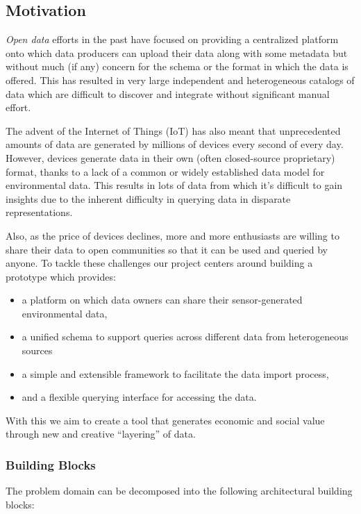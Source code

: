 \subsection{Motivation}\label{motivation}

\emph{Open data} efforts in the past have focused on providing a
centralized platform onto which data producers can upload their data
along with some metadata but without much (if any) concern for the
schema or the format in which the data is offered. This has resulted in
very large independent and heterogeneous catalogs of data which are
difficult to discover and integrate without significant manual effort.

The advent of the Internet of Things (IoT) has also meant that
unprecedented amounts of data are generated by millions of devices every
second of every day. However, devices generate data in their own (often
closed-source proprietary) format, thanks to a lack of a common or
widely established data model for environmental data. This results in
lots of data from which it's difficult to gain insights due to the
inherent difficulty in querying data in disparate representations.

Also, as the price of devices declines, more and more enthusiasts are
willing to share their data to open communities so that it can be used
and queried by anyone. To tackle these challenges our project centers
around building a prototype which provides:

\begin{itemize}
\tightlist
\item
  a platform on which data owners can share their sensor-generated
  environmental data,
\item
  a unified schema to support queries across different data from
  heterogeneous sources
\item
  a simple and extensible framework to facilitate the data import
  process,
\item
  and a flexible querying interface for accessing the data.
\end{itemize}

With this we aim to create a tool that generates economic and social
value through new and creative ``layering'' of data.

\subsubsection{Building Blocks}\label{building-blocks}

The problem domain can be decomposed into the following architectural
building blocks:

